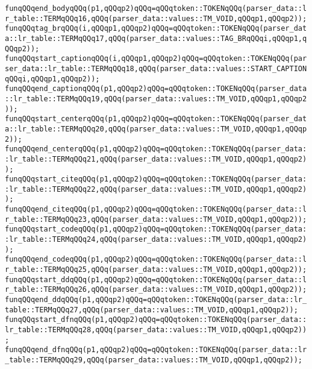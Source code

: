 \verb|funqQQqend_bodyqQQq(p1,qQQqp2)qQQq=qQQqtoken::TOKENqQQq(parser_data::lr_table::TERMqQQq16,qQQq(parser_data::values::TM_VOID,qQQqp1,qQQqp2));|\newline
\verb|funqQQqtag_brqQQq(i,qQQqp1,qQQqp2)qQQq=qQQqtoken::TOKENqQQq(parser_data::lr_table::TERMqQQq17,qQQq(parser_data::values::TAG_BRqQQqi,qQQqp1,qQQqp2));|\newline
\verb|funqQQqstart_captionqQQq(i,qQQqp1,qQQqp2)qQQq=qQQqtoken::TOKENqQQq(parser_data::lr_table::TERMqQQq18,qQQq(parser_data::values::START_CAPTIONqQQqi,qQQqp1,qQQqp2));|\newline
\verb|funqQQqend_captionqQQq(p1,qQQqp2)qQQq=qQQqtoken::TOKENqQQq(parser_data::lr_table::TERMqQQq19,qQQq(parser_data::values::TM_VOID,qQQqp1,qQQqp2));|\newline
\verb|funqQQqstart_centerqQQq(p1,qQQqp2)qQQq=qQQqtoken::TOKENqQQq(parser_data::lr_table::TERMqQQq20,qQQq(parser_data::values::TM_VOID,qQQqp1,qQQqp2));|\newline
\verb|funqQQqend_centerqQQq(p1,qQQqp2)qQQq=qQQqtoken::TOKENqQQq(parser_data::lr_table::TERMqQQq21,qQQq(parser_data::values::TM_VOID,qQQqp1,qQQqp2));|\newline
\verb|funqQQqstart_citeqQQq(p1,qQQqp2)qQQq=qQQqtoken::TOKENqQQq(parser_data::lr_table::TERMqQQq22,qQQq(parser_data::values::TM_VOID,qQQqp1,qQQqp2));|\newline
\verb|funqQQqend_citeqQQq(p1,qQQqp2)qQQq=qQQqtoken::TOKENqQQq(parser_data::lr_table::TERMqQQq23,qQQq(parser_data::values::TM_VOID,qQQqp1,qQQqp2));|\newline
\verb|funqQQqstart_codeqQQq(p1,qQQqp2)qQQq=qQQqtoken::TOKENqQQq(parser_data::lr_table::TERMqQQq24,qQQq(parser_data::values::TM_VOID,qQQqp1,qQQqp2));|\newline
\verb|funqQQqend_codeqQQq(p1,qQQqp2)qQQq=qQQqtoken::TOKENqQQq(parser_data::lr_table::TERMqQQq25,qQQq(parser_data::values::TM_VOID,qQQqp1,qQQqp2));|\newline
\verb|funqQQqstart_ddqQQq(p1,qQQqp2)qQQq=qQQqtoken::TOKENqQQq(parser_data::lr_table::TERMqQQq26,qQQq(parser_data::values::TM_VOID,qQQqp1,qQQqp2));|\newline
\verb|funqQQqend_ddqQQq(p1,qQQqp2)qQQq=qQQqtoken::TOKENqQQq(parser_data::lr_table::TERMqQQq27,qQQq(parser_data::values::TM_VOID,qQQqp1,qQQqp2));|\newline
\verb|funqQQqstart_dfnqQQq(p1,qQQqp2)qQQq=qQQqtoken::TOKENqQQq(parser_data::lr_table::TERMqQQq28,qQQq(parser_data::values::TM_VOID,qQQqp1,qQQqp2));|\newline
\verb|funqQQqend_dfnqQQq(p1,qQQqp2)qQQq=qQQqtoken::TOKENqQQq(parser_data::lr_table::TERMqQQq29,qQQq(parser_data::values::TM_VOID,qQQqp1,qQQqp2));|\newline
